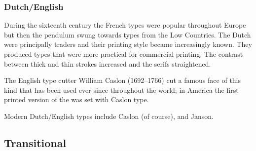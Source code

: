 \documentclass[10pt,a4paper,oneside,extrafontsizes]{memoir}%
\begin{document}
\subsubsection{Dutch/English}


\begin{paracol}{2}
\switchEng
    During the sixteenth century the French types were popular throughout
Europe but then the pendulum swung towards types from the Low Countries.
The Dutch were principally traders and their printing style became 
increasingly known. They produced types that were more practical for
commercial printing. The contrast between thick and thin strokes increased
and the serifs straightened.

The English type cutter William Caslon (1692--1766) 
cut a famous face of this kind that has been used ever since throughout the 
world; in America the first printed version of the 
was set with Caslon type.

    Modern Dutch/English types include
Caslon (of course),
and Janson.
\end{paracol}

\subsection{Transitional}
\end{document}
